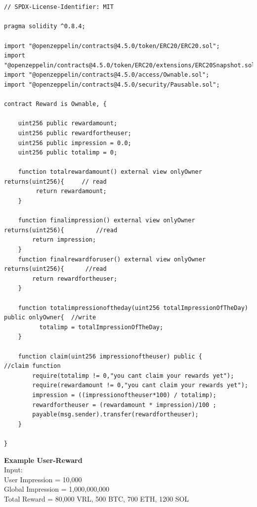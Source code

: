 \documentclass[10pt]{article}
\begin{document}
\begin{lstlisting}[language=Solidity, caption={Example User Reward Contract in Solidity}, numbers=none]


// SPDX-License-Identifier: MIT

pragma solidity ^0.8.4;

import "@openzeppelin/contracts@4.5.0/token/ERC20/ERC20.sol";
import "@openzeppelin/contracts@4.5.0/token/ERC20/extensions/ERC20Snapshot.sol";
import "@openzeppelin/contracts@4.5.0/access/Ownable.sol";
import "@openzeppelin/contracts@4.5.0/security/Pausable.sol";

contract Reward is Ownable, {
   
    uint256 public rewardamount;
    uint256 public rewardfortheuser;
    uint256 public impression = 0.0;
    uint256 public totalimp = 0;
    
    function totalrewardamount() external view onlyOwner returns(uint256){     // read 
         return rewardamount;
    }

    function finalimpression() external view onlyOwner returns(uint256){         //read
        return impression;
    }
    function finalrewardforuser() external view onlyOwner returns(uint256){      //read
        return rewardfortheuser;
    }

    function totalimpressionoftheday(uint256 totalImpressionOfTheDay) public onlyOwner{  //write
          totalimp = totalImpressionOfTheDay;
    }
    
    function claim(uint256 impressionoftheuser) public {                         //claim function
        require(totalimp != 0,"you cant claim your rewards yet");
        require(rewardamount != 0,"you cant claim your rewards yet");
        impression = ((impressionoftheuser*100) / totalimp);
        rewardfortheuser = (rewardamount * impression)/100 ;
        payable(msg.sender).transfer(rewardfortheuser);
    }

}
\end{lstlisting}


\textbf{Example User-Reward}\\

Input:\\
User Impression = 10,000\\
Global Impression = 1,000,000,000\\
Total Reward = 80,000 VRL, 500 BTC, 700 ETH, 1200 SOL \\
\end{document}
